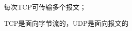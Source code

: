 每次TCP可传输多个报文；

TCP是面向字节流的，UDP是面向报文的










































































